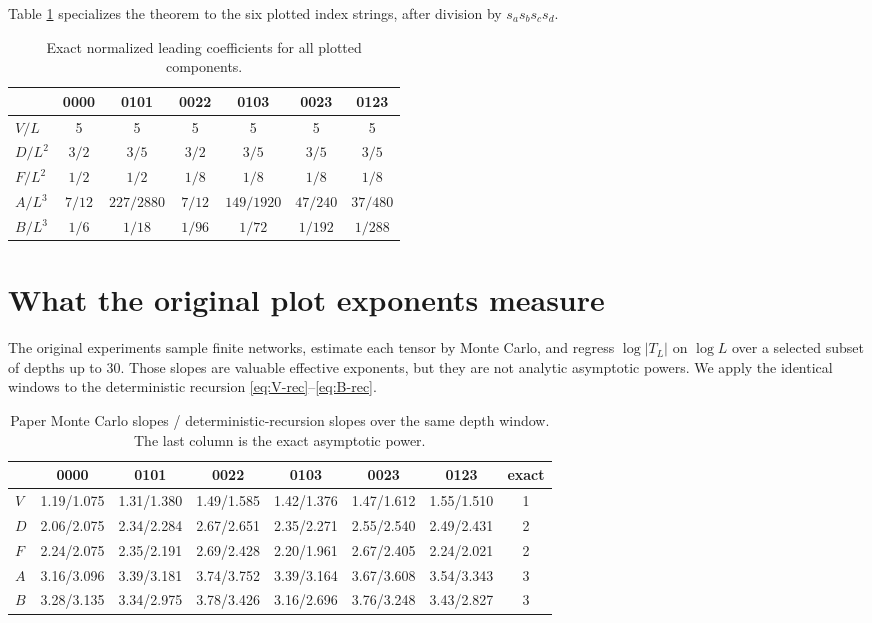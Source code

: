 \documentclass{article}
\begin{document}
Table \ref{tab:coefficients} specializes the theorem to the six plotted
index strings, after division by \(s_as_bs_cs_d\).
\begin{table}[t]
\centering
\caption{Exact normalized leading coefficients for all plotted components.}
\label{tab:coefficients}
\small
\begin{tabular}{lcccccc}
\toprule
&0000&0101&0022&0103&0023&0123\\
\midrule
\(V/L\)&5&5&5&5&5&5\\
\(D/L^2\)&\(3/2\)&\(3/5\)&\(3/2\)&\(3/5\)&\(3/5\)&\(3/5\)\\
\(F/L^2\)&\(1/2\)&\(1/2\)&\(1/8\)&\(1/8\)&\(1/8\)&\(1/8\)\\
\(A/L^3\)&\(7/12\)&\(227/2880\)&\(7/12\)&\(149/1920\)&\(47/240\)&\(37/480\)\\
\(B/L^3\)&\(1/6\)&\(1/18\)&\(1/96\)&\(1/72\)&\(1/192\)&\(1/288\)\\
\bottomrule
\end{tabular}
\end{table}

\section{What the original plot exponents measure}
\label{sec:plot-exponents}

The original experiments sample finite networks, estimate each tensor by
Monte Carlo, and regress \(\log|T_L|\) on \(\log L\) over a selected subset
of depths up to \(30\).  Those slopes are valuable effective exponents, but
they are not analytic asymptotic powers.  We apply the identical windows to
the deterministic recursion \eqref{eq:V-rec}--\eqref{eq:B-rec}.

\begin{table}[t]
\centering
\caption{Paper Monte Carlo slopes / deterministic-recursion slopes over the
same depth window.  The last column is the exact asymptotic power.}
\label{tab:effective-slopes}
\scriptsize
\setlength{\tabcolsep}{3.5pt}
\begin{tabular}{lccccccc}
\toprule
&0000&0101&0022&0103&0023&0123&exact\\
\midrule
\(V\)&1.19/1.075&1.31/1.380&1.49/1.585&1.42/1.376&1.47/1.612&1.55/1.510&1\\
\(D\)&2.06/2.075&2.34/2.284&2.67/2.651&2.35/2.271&2.55/2.540&2.49/2.431&2\\
\(F\)&2.24/2.075&2.35/2.191&2.69/2.428&2.20/1.961&2.67/2.405&2.24/2.021&2\\
\(A\)&3.16/3.096&3.39/3.181&3.74/3.752&3.39/3.164&3.67/3.608&3.54/3.343&3\\
\(B\)&3.28/3.135&3.34/2.975&3.78/3.426&3.16/2.696&3.76/3.248&3.43/2.827&3\\
\bottomrule
\end{tabular}
\end{table}
\end{document}
